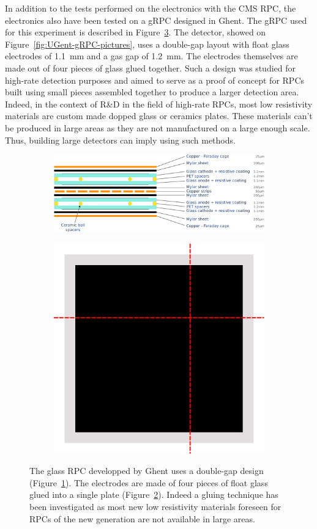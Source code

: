 	In addition to the tests performed on the electronics with the CMS RPC, the electronics also have been tested on a gRPC designed in Ghent. The gRPC used for this experiment is described in Figure~\ref{fig:UGent-gRPC-design}. The detector, showed on Figure~\ref{fig:UGent-gRPC-pictures}, uses a double-gap layout with float glass electrodes of \SI{1.1}{mm} and a gas gap of \SI{1.2}{mm}. The electrodes themselves are made out of four pieces of glass glued together. Such a design was studied for high-rate detection purposes and aimed to serve as a proof of concept for RPCs built using small pieces assembled together to produce a larger detection area. Indeed, in the context of R\&D in the field of high-rate RPCs, most low resistivity materials are custom made dopped glass or ceramics plates. These materials can't be produced in large areas as they are not manufactured on a large enough scale. Thus, building large detectors can imply using such methods.
	 
	\begin{figure}[H]
		\begin{subfigure}{\linewidth}
		    \centering
			\includegraphics[width = .8\linewidth]{fig/chapt6/gRPC-design.pdf}
			\caption{\label{fig:UGent-gRPC-design:A}}
		\end{subfigure}
		\begin{subfigure}{\linewidth}
		    \centering
			\includegraphics[width = .4\linewidth]{fig/chapt6/gRPC-assembly.pdf}
			\caption{\label{fig:UGent-gRPC-design:B}}
		\end{subfigure}
		\caption{\label{fig:UGent-gRPC-design} The glass RPC developped by Ghent uses a double-gap design (Figure~\ref{fig:UGent-gRPC-design:A}). The electrodes are made of four pieces of float glass glued into a single plate (Figure~\ref{fig:UGent-gRPC-design:B}). Indeed a gluing technique has been investigated as most new low resistivity materials foreseen for RPCs of the new generation are not available in large areas.}
    \end{figure}
	 
